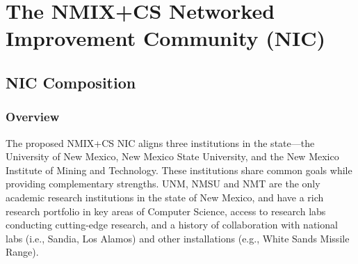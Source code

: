 \section{The NMIX+CS Networked Improvement Community (NIC)}
\label{sec:consortium}

\subsection{NIC Composition}

\subsubsection{Overview}
The proposed NMIX+CS NIC aligns three institutions in the state---the University of New Mexico, New Mexico State University, and the New Mexico Institute of Mining and Technology. These institutions share common goals while providing complementary strengths. UNM, NMSU and NMT are the only academic research institutions in the state of New Mexico, and have a rich research portfolio in key areas of Computer Science, access to research labs conducting cutting-edge research, and a history of collaboration with national labs (i.e., Sandia, Los Alamos) and other installations (e.g., White Sands Missile Range). %

